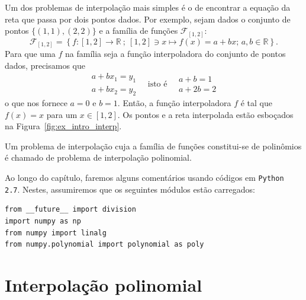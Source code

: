 \begin{ex}\label{ex:intro_interpolacao}
  Um dos problemas de interpolação mais simples é o de encontrar a equação da reta que passa por dois pontos dados. Por exemplo, sejam dados o conjunto de pontos $\{(1, 1), (2, 2)\}$ e a família de funções $\mathcal{F}_{[1,2]}$:
  \begin{equation*}
   \mathcal{F}_{[1,2]} = \left\{f:[1,2]\rightarrow \mathbb{R}~;~[1,2]\ni x\mapsto f(x) = a + bx;\,a,b\in\mathbb{R}\right\}.
  \end{equation*}
  Para que uma $f$ na família seja a função interpoladora do conjunto de pontos dados, precisamos que
  \begin{equation*}
    \begin{array}{l}
      a + bx_1 = y_1\\
      a + bx_2 = y_2
    \end{array}\quad\text{isto é}\quad
    \begin{array}{l}
      a + b = 1\\
      a + 2b = 2
    \end{array}
  \end{equation*}
o que nos fornece $a = 0$ e $b = 1$. Então, a função interpoladora $f$ é tal que  $f(x) = x$ para um $x\in[1,2]$. Os pontos e a reta interpolada estão esboçados na Figura~\ref{fig:ex_intro_interp}.
\end{ex}

Um problema de interpolação cuja a família de funções constitui-se de polinômios é chamado de problema de interpolação polinomial.

\ifispython
Ao longo do capítulo, faremos alguns comentários usando códigos em \verb+Python 2.7+. Nestes, assumiremos que os seguintes módulos estão carregados:
\begin{verbatim}
from __future__ import division
import numpy as np
from numpy import linalg
from numpy.polynomial import polynomial as poly
\end{verbatim}
\fi


\section{Interpolação polinomial}

